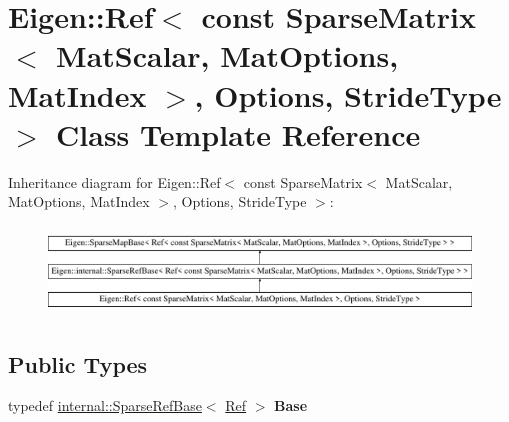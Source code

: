 \hypertarget{class_eigen_1_1_ref_3_01const_01_sparse_matrix_3_01_mat_scalar_00_01_mat_options_00_01_mat_index1bbfd78857ba9c14d54178cb3009ac38}{}\section{Eigen\+::Ref$<$ const Sparse\+Matrix$<$ Mat\+Scalar, Mat\+Options, Mat\+Index $>$, Options, Stride\+Type $>$ Class Template Reference}
\label{class_eigen_1_1_ref_3_01const_01_sparse_matrix_3_01_mat_scalar_00_01_mat_options_00_01_mat_index1bbfd78857ba9c14d54178cb3009ac38}
Inheritance diagram for Eigen\+::Ref$<$ const Sparse\+Matrix$<$ Mat\+Scalar, Mat\+Options, Mat\+Index $>$, Options, Stride\+Type $>$\+:\begin{figure}[H]
\begin{center}
\leavevmode
\includegraphics[height=2.376238cm]{class_eigen_1_1_ref_3_01const_01_sparse_matrix_3_01_mat_scalar_00_01_mat_options_00_01_mat_index1bbfd78857ba9c14d54178cb3009ac38}
\end{center}
\end{figure}
\subsection*{Public Types}
\begin{DoxyCompactItemize}
\item 
\mbox{\label{class_eigen_1_1_ref_3_01const_01_sparse_matrix_3_01_mat_scalar_00_01_mat_options_00_01_mat_index1bbfd78857ba9c14d54178cb3009ac38_a8a8f6c044d88e4d3bb0055c282ecf76e}} 
typedef \mbox{\hyperlink{class_eigen_1_1internal_1_1_sparse_ref_base}{internal\+::\+Sparse\+Ref\+Base}}$<$ \mbox{\hyperlink{class_eigen_1_1_ref}{Ref}} $>$ {\bfseries Base}
\end{DoxyCompactItemize}

